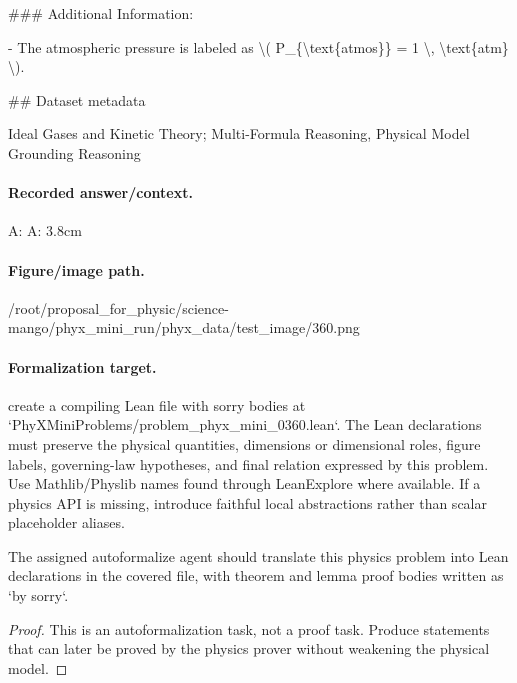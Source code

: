 \#\#\# Additional Information:

- The atmospheric pressure is labeled as \textbackslash{}( P\_\{\textbackslash{}text\{atmos\}\} = 1 \textbackslash{}, \textbackslash{}text\{atm\} \textbackslash{}).

\#\# Dataset metadata

Ideal Gases and Kinetic Theory; Multi-Formula Reasoning, Physical Model Grounding Reasoning

\paragraph{Recorded answer/context.}
A: A: 3.8cm

\paragraph{Figure/image path.}
/root/proposal\_for\_physic/science-mango/phyx\_mini\_run/phyx\_data/test\_image/360.png

\paragraph{Formalization target.}
create a compiling Lean file with sorry bodies at `PhyXMiniProblems/problem\_phyx\_mini\_0360.lean`. The Lean declarations must preserve the physical quantities, dimensions or dimensional roles, figure labels, governing-law hypotheses, and final relation expressed by this problem.
Use Mathlib/Physlib names found through LeanExplore where available. If a physics API is missing, introduce faithful local abstractions rather than scalar placeholder aliases.

\begin{theorem}
\label{thm:physics:phyx_mini_0360:target}
The assigned autoformalize agent should translate this physics problem into Lean declarations in the covered file, with theorem and lemma proof bodies written as `by sorry`.
\end{theorem}
\begin{proof}
This is an autoformalization task, not a proof task. Produce statements that can later be proved by the physics prover without weakening the physical model.
\end{proof}

